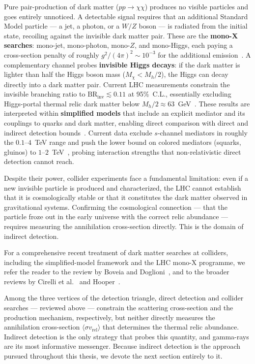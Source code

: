 Pure pair-production of dark matter ($pp \to \chi\chi$) produces no visible particles and goes entirely unnoticed.
A detectable signal requires that an additional Standard Model particle --- a jet, a photon, or a $W/Z$ boson --- is radiated from the initial state, recoiling against the invisible dark matter pair.
These are the \textbf{mono-X searches}: mono-jet, mono-photon, mono-$Z$, and mono-Higgs, each paying a cross-section penalty of roughly $g^2/(4\pi)^2 \sim 10^{-3}$ for the additional emission~\cite{Cirelli:2024ssz}.
A complementary channel probes \textbf{invisible Higgs decays}: if the dark matter is lighter than half the Higgs boson mass ($M_\chi < M_h/2$), the Higgs can decay directly into a dark matter pair.
Current LHC measurements constrain the invisible branching ratio to $\text{BR}_\text{inv} \lesssim 0.11$ at 95\%~C.L., essentially excluding Higgs-portal thermal relic dark matter below $M_h/2 \approx 63$~GeV~\cite{ATLAS:2023tkt,Cirelli:2024ssz}.
These results are interpreted within \textbf{simplified models} that include an explicit mediator and its couplings to quarks and dark matter, enabling direct comparison with direct and indirect detection bounds~\cite{Boveia:2018yeb}.
Current data exclude $s$-channel mediators in roughly the $0.1$--$4$~TeV range and push the lower bound on colored mediators (squarks, gluinos) to $1$--$2$~TeV~\cite{Cirelli:2024ssz,Hooper:2024}, probing interaction strengths that non-relativistic direct detection cannot reach.

Despite their power, collider experiments face a fundamental limitation: even if a new invisible particle is produced and characterized, the LHC cannot establish that it is cosmologically stable or that it constitutes the dark matter observed in gravitational systems.
Confirming the cosmological connection --- that the particle froze out in the early universe with the correct relic abundance --- requires measuring the annihilation cross-section directly.
This is the domain of indirect detection.

For a comprehensive recent treatment of dark matter searches at colliders, including the simplified-model framework and the LHC mono-X programme, we refer the reader to the review by Boveia and Doglioni~\cite{Boveia:2018yeb}, and to the broader reviews by Cirelli et al.~\cite{Cirelli:2024ssz} and Hooper~\cite{Hooper:2024}.

Among the three vertices of the detection triangle, direct detection and collider searches --- reviewed above --- constrain the scattering cross-section and the production mechanism, respectively, but neither directly measures the annihilation cross-section $\langle \sigma v_\text{rel} \rangle$ that determines the thermal relic abundance.
Indirect detection is the only strategy that probes this quantity, and gamma-rays are its most informative messenger.
Because indirect detection is the approach pursued throughout this thesis, we devote the next section entirely to it.
